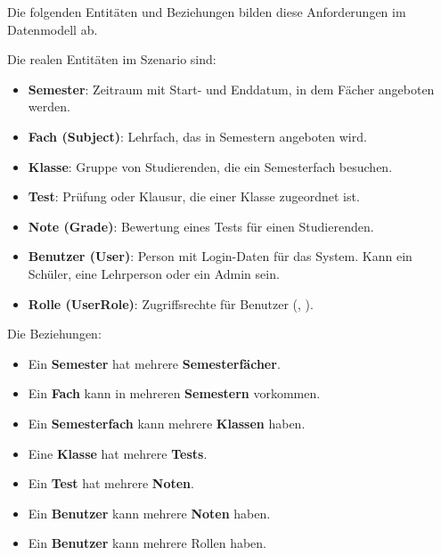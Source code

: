\documentclass[12pt,a4paper]{article}
\newcommand{\code}[1]{\texttt{\detokenize{#1}}}
\begin{document}
    Die folgenden Entitäten und Beziehungen bilden diese Anforderungen im Datenmodell ab.

    Die realen Entitäten im Szenario sind:

    \begin{itemize}
        \item \textbf{Semester}: Zeitraum mit Start- und Enddatum, in dem Fächer angeboten werden.
        \item \textbf{Fach (Subject)}: Lehrfach, das in Semestern angeboten wird.
        \item \textbf{Klasse}: Gruppe von Studierenden, die ein Semesterfach besuchen.
        \item \textbf{Test}: Prüfung oder Klausur, die einer Klasse zugeordnet ist.
        \item \textbf{Note (Grade)}: Bewertung eines Tests für einen Studierenden.
        \item \textbf{Benutzer (User)}: Person mit Login-Daten für das System. Kann ein Schüler, eine Lehrperson oder ein Admin sein.
        \item \textbf{Rolle (UserRole)}: Zugriffsrechte für Benutzer (\code{USER}, \code{ADMIN}).
    \end{itemize}

    Die Beziehungen:
    \begin{itemize}
        \item Ein \textbf{Semester} hat mehrere \textbf{Semesterfächer}.
        \item Ein \textbf{Fach} kann in mehreren \textbf{Semestern} vorkommen.
        \item Ein \textbf{Semesterfach} kann mehrere \textbf{Klassen} haben.
        \item Eine \textbf{Klasse} hat mehrere \textbf{Tests}.
        \item Ein \textbf{Test} hat mehrere \textbf{Noten}.
        \item Ein \textbf{Benutzer} kann mehrere \textbf{Noten} haben.
        \item Ein \textbf{Benutzer} kann mehrere Rollen haben.
    \end{itemize}
\end{document}
